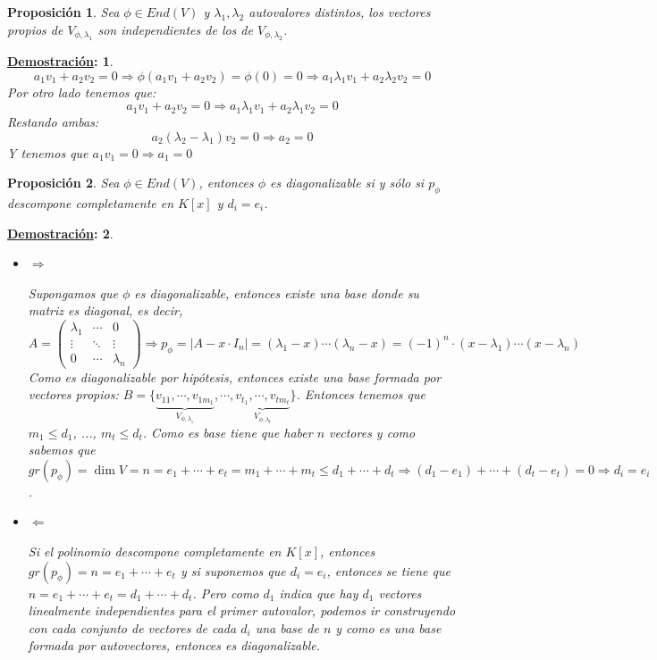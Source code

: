 \documentclass[10pt,a4paper,openright]{book}
\theoremstyle{break}
\newtheorem*{prop}{Proposición}
\newtheorem*{demo}{\underline{Demostración}:}
\begin{document}
\begin{prop}
Sea $\phi \in End(V)$ y $\lambda_1, \lambda_2 $ autovalores distintos, los vectores propios de $V_{\phi, \lambda_1}$ son independientes de los de $V_{\phi, \lambda_2}$.
\end{prop}
\begin{demo}
$$a_1v_1+a_2v_2=0\Rightarrow \phi(a_1v_1+a_2v_2)=\phi(0)=0\Rightarrow a_1\lambda_1v_1+a_2\lambda_2v_2=0$$
Por otro lado tenemos que:
$$a_1v_1+a_2v_2=0\Rightarrow a_1\lambda_1v_1+a_2\lambda_1v_2=0$$
Restando ambas:
$$a_2(\lambda_2-\lambda_1)v_2=0\Rightarrow a_2=0$$
Y tenemos que $a_1v_1=0\Rightarrow a_1=0$
\end{demo}

\begin{prop}
Sea $\phi\in End(V)$, entonces $\phi$ es diagonalizable si y sólo si $p_\phi$ descompone completamente en $K[x]$ y $d_i=e_i$.
\end{prop}
\begin{demo}
\begin{itemize}
\item $\Rightarrow$

Supongamos que $\phi$ es diagonalizable, entonces existe una base donde su matriz es diagonal, es decir,
$$A=\begin{pmatrix}\lambda_1 &\cdots &0\\ \vdots &\ddots & \vdots\\ 0 &\cdots &\lambda_n\end{pmatrix} \Rightarrow p_\phi = |A-x\cdot I_n|=(\lambda_1-x)\cdots (\lambda_n-x)=(-1)^n\cdot (x-\lambda_1)\cdots (x-\lambda_n)$$
Como es diagonalizable por hipótesis, entonces existe una base formada por vectores propios: $B=\{\underbrace{v_{11}, \cdots, v_{1m_1}}_{V_{\phi,\lambda_1}}, \cdots,\underbrace{v_{t_1}, \cdots, v_{tm_t}}_{V_{\phi,\lambda_t}}\}$. Entonces tenemos que $m_1\leq d_1$, ..., $m_t\leq d_t$. Como es base tiene que haber $n$ vectores y como sabemos que $gr(p_\phi)=\dim V = n= e_1+\cdots+e_t=m_1+\cdots+m_t\leq d_1+\cdots+d_t\Rightarrow (d_1-e_1)+\cdots+(d_t-e_t)=0\Rightarrow d_i=e_i$.

\item $\Leftarrow$

Si el polinomio descompone completamente en $K[x]$, entonces $gr(p_\phi)=n = e_1+\cdots+e_t$ y si suponemos que $d_i=e_i$, entonces se tiene que $n=e_1+\cdots+e_t=d_1+\cdots+d_t$. Pero como $d_1$ indica que hay $d_1$ vectores linealmente independientes para el primer autovalor, podemos ir construyendo con cada conjunto de vectores de cada $d_i$ una base de $n$ y como es una base formada por autovectores, entonces es diagonalizable.
\end{itemize}
\end{demo}
\end{document}
